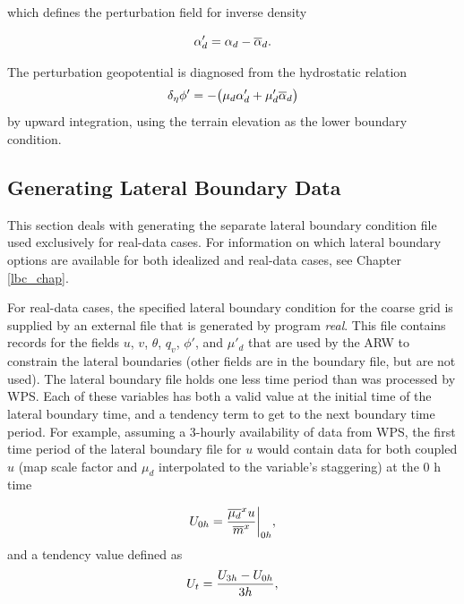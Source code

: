 \noindent which defines the perturbation field for inverse density

\begin{equation}
\alpha'_d = \alpha_d - \overline{\alpha}_d.
\notag
\end{equation}

\noindent 
The perturbation geopotential 
is diagnosed from the hydrostatic relation
\begin{equation}
\delta_{\eta} \phi'  = - \big ( {\mu}_d \alpha'_d + \mu'_d
\overline{\alpha}_d \big )
\notag
\end{equation}
%
by upward integration, using the terrain elevation as the lower boundary condition.

\subsection{Generating Lateral Boundary Data}

This section deals with generating the separate lateral boundary condition file used
exclusively for real-data cases.  For information
on which lateral boundary options are available for both idealized and real-data
cases, see Chapter \eqref{lbc_chap}.

For real-data cases, the specified 
lateral boundary condition for the coarse grid is supplied by an external file that is
generated by program {\it real}.
This file contains 
records for the fields $u$, $v$, $\theta$, $q_v$, $\phi'$, and $\mu'_d$ that are used by the ARW to
constrain the lateral boundaries (other fields are in the boundary file, but are not used).   
The lateral boundary file holds one less time period than was processed by WPS.
Each of these variables has both
a valid value at the initial time of the lateral boundary time, and a tendency term to get to the 
next boundary time period.  For example, assuming a 3-hourly availability of data from WPS,
the first time period of the lateral boundary file
for $u$ would contain data for both coupled $u$ (map scale factor and $\mu_d$ interpolated to 
the variable's 
staggering) at the 0 h time

\begin{equation}
U_{0h} = {{\overline{\mu_d}^x u}\over{\overline{m}^x}} \bigg | _{0h},
\notag
\end{equation}
\noindent and a tendency value defined as
\begin{equation}
U_t = { U_{3h} - U_{0h} \over 3h},
\notag
\end{equation}

